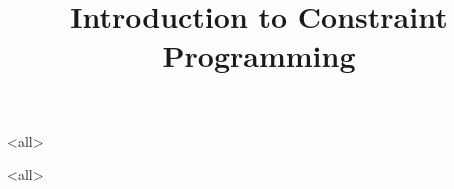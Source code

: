\title[Introduction to CP] %
{Introduction to Constraint Programming}

\subtitle
{} %



\mode<all>{

}
\mode<all>{

}


